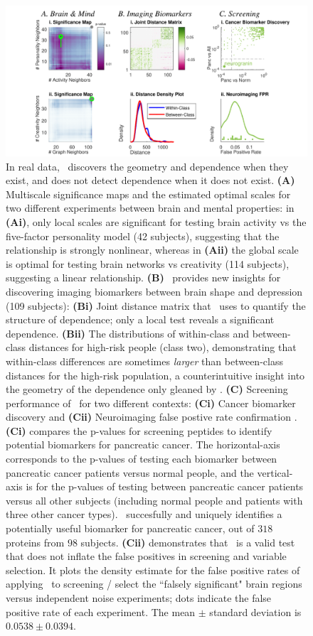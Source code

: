 \documentclass[11pt]{extarticle}
\begin{document}
\begin{figure}[!ht]
\includegraphics[width=1.0\textwidth,trim={2cm 0 1cm 0},clip]{Figures/FigReal}
\caption{In real data, \Mgc~discovers the geometry and dependence when they exist, and does not detect dependence when it does not exist.  \textbf{(A)} Multiscale significance maps and the estimated optimal scales for two different experiments between brain and mental properties: in \textbf{(Ai)}, only local scales are significant for testing brain activity vs the five-factor personality model (42 subjects), suggesting that the relationship is strongly nonlinear, whereas in \textbf{(Aii)} the global scale is optimal for testing brain networks vs creativity (114 subjects), suggesting a linear relationship.
%
\textbf{(B)} \Mgc~provides new insights for discovering imaging biomarkers between brain shape and depression (109 subjects): \textbf{(Bi)} Joint distance matrix that \Mgc~uses to quantify the structure of dependence; only a local test reveals a significant dependence.
\textbf{(Bii)} The distributions of within-class and between-class distances for high-risk people (class two), demonstrating that within-class differences are sometimes \emph{larger} than between-class distances for the high-risk population, a counterintuitive insight into the geometry of the dependence only gleaned by \Mgc.
\textbf{(C)} Screening performance of \Mgc~for two different contexts: \textbf{(Ci)} Cancer biomarker discovery \cite{Wang2017} and \textbf{(Cii)} Neuroimaging false postive rate confirmation \cite{Eklund2015}.
\textbf{(Ci)}  compares the p-values for screening peptides to identify potential biomarkers for pancreatic cancer. The horizontal-axis corresponds to the p-values of testing each biomarker between pancreatic cancer patients versus normal people, and the vertical-axis is for the p-values of testing between pancreatic cancer patients versus all other subjects (including normal people and patients with three other cancer types). \Mgc~succesfully and uniquely identifies a potentially useful biomarker for pancreatic cancer, out of $318$ proteins from $98$ subjects.
\textbf{(Cii)} demonstrates that \Mgc~is a valid test that does not inflate the false positives in screening and variable selection. It plots the density estimate for the false positive rates of applying \Mgc~to screening / select the ``falsely significant" brain regions versus  independent noise experiments; dots indicate the false positive rate of each experiment. The mean $\pm$ standard deviation is $0.0538 \pm 0.0394$.}
\label{f:real}
\end{figure}
\end{document}
